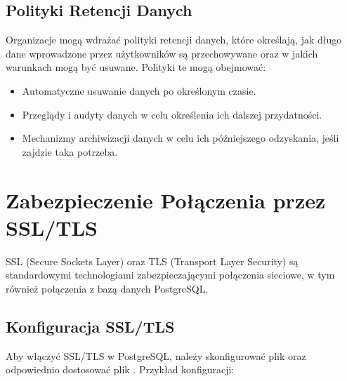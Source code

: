 \documentclass[letterpaper,10pt,polish]{sphinxmanual}
\begin{document}
\section{Polityki Retencji Danych}
\label{\detokenize{sprawozdanie/source/rozdzialy/rozdzial3:polityki-retencji-danych}}
\sphinxAtStartPar
Organizacje mogą wdrażać polityki retencji danych, które określają, jak
długo dane wprowadzone przez użytkowników są przechowywane oraz w jakich
warunkach mogą być usuwane. Polityki te mogą obejmować:
\begin{itemize}
\item {} 
\sphinxAtStartPar
Automatyczne usuwanie danych po określonym czasie.

\item {} 
\sphinxAtStartPar
Przeglądy i audyty danych w celu określenia ich dalszej przydatności.

\item {} 
\sphinxAtStartPar
Mechanizmy archiwizacji danych w celu ich późniejszego odzyskania,
jeśli zajdzie taka potrzeba.

\end{itemize}

\sphinxstepscope


\chapter{Zabezpieczenie Połączenia przez SSL/TLS}
\label{\detokenize{sprawozdanie/source/rozdzialy/rozdzial4:zabezpieczenie-polaczenia-przez-ssl-tls}}\label{\detokenize{sprawozdanie/source/rozdzialy/rozdzial4::doc}}
\sphinxAtStartPar
SSL (Secure Sockets Layer) oraz TLS (Transport Layer Security) są
standardowymi technologiami zabezpieczającymi połączenia sieciowe, w tym
również połączenia z bazą danych PostgreSQL.


\section{Konfiguracja SSL/TLS}
\label{\detokenize{sprawozdanie/source/rozdzialy/rozdzial4:konfiguracja-ssl-tls}}
\sphinxAtStartPar
Aby włączyć SSL/TLS w PostgreSQL, należy skonfigurować plik
 oraz odpowiednio dostosować plik .
Przykład konfiguracji:

\begin{sphinxVerbatim}[commandchars=\\\{\}]
  
  
  
\end{sphinxVerbatim}
\end{document}
